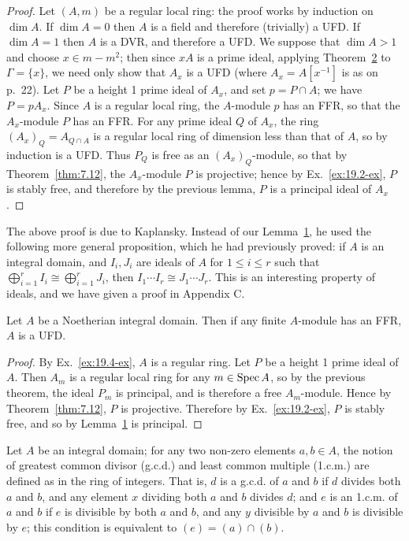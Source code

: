 \begin{proof}
Let $(A, m)$ be a regular local ring: the proof works by induction
on $\dim A$. If $\dim A = 0$ then $A$ is a field and therefore (trivially) a UFD.
If $\dim A = 1$ then $A$ is a DVR, and therefore a UFD. We suppose that
$\dim A > 1$ and choose $x \in m - m^2$; then since $xA$ is a prime ideal, applying
Theorem~\hyperref[thm:20.2]{2} to $\Gamma = \{x\}$, we need only show that $A_x$ is a UFD (where
$A_x = A[x^{-1}]$ is as on p.~22). Let $P$ be a height 1 prime ideal of $A_x$, and
set $p = P \cap A$; we have $P = pA_x$. Since $A$ is a regular local ring, the
$A$-module $p$ has an FFR, so that the $A_x$-module $P$ has an FFR. For any
prime ideal $Q$ of $A_x$, the ring $(A_x)_Q = A_{Q \cap A}$ is a regular local ring of
dimension less than that of $A$, so by induction is a UFD. Thus $P_Q$ is free
as an $(A_x)_Q$-module, so that by Theorem~\ref{thm:7.12}, the $A_x$-module $P$ is projective;
hence by Ex.~\ref{ex:19.2-ex}, $P$ is stably free, and therefore by the previous lemma,
$P$ is a principal ideal of $A_x$.
\end{proof}

The above proof is due to Kaplansky. Instead of our Lemma~\hyperref[lem:20.1]{1}, he used
the following more general proposition, which he had previously proved:
if $A$ is an integral domain, and $I_i, J_i$ are ideals of $A$ for $1 \le i \le r$ such that
$\bigoplus_{i=1}^{r} I_i \cong \bigoplus_{i=1}^{r} J_i$, then $I_1 \cdots I_r \cong J_1 \cdots J_r$. This is an interesting property
of ideals, and we have given a proof in Appendix C.

\begin{theorem}\label{thm:20.4}
Let $A$ be a Noetherian integral domain. Then if any finite
$A$-module has an FFR, $A$ is a UFD.
\end{theorem}

\begin{proof}
By Ex.~\ref{ex:19.4-ex}, $A$ is a regular ring. Let $P$ be a height 1 prime ideal
of $A$. Then $A_m$ is a regular local ring for any $m \in \operatorname{Spec} A$, so by the previous
theorem, the ideal $P_m$ is principal, and is therefore a free $A_m$-module. Hence
by Theorem~\ref{thm:7.12}, $P$ is projective. Therefore by Ex.~\ref{ex:19.2-ex}, $P$ is stably free,
and so by Lemma~\hyperref[lem:20.1]{1} is principal.
\end{proof}

Let $A$ be an integral domain; for any two non-zero elements $a, b \in A$,
the notion of greatest common divisor (g.c.d.) and least common multiple
(1.c.m.) are defined as in the ring of integers. That is, $d$ is a g.c.d. of $a$ and
$b$ if $d$ divides both $a$ and $b$, and any element $x$ dividing both $a$ and $b$
divides $d$; and $e$ is an 1.c.m. of $a$ and $b$ if $e$ is divisible by both $a$ and $b$,
and any $y$ divisible by $a$ and $b$ is divisible by $e$; this condition is equivalent
to $(e) = (a) \cap (b)$.

